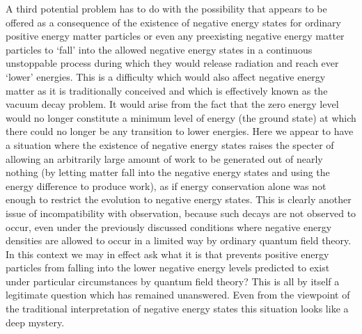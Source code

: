\documentclass[notitlepage,12pt]{report}
\begin{document}
A third potential problem has to do with the possibility that appears to be offered as a consequence of the existence of negative energy states for ordinary positive energy matter particles or even any preexisting negative energy matter particles to `fall' into the allowed negative energy states in a continuous unstoppable process during which they would release radiation and reach ever `lower' energies. This is a difficulty which would also affect negative energy matter as it is traditionally conceived and which is effectively known as the vacuum decay problem. It would arise from the fact that the zero energy level would no longer constitute a minimum level of energy (the ground state) at which there could no longer be any transition to lower energies. Here we appear to have a situation where the existence of negative energy states raises the specter of allowing an arbitrarily large amount of work to be generated out of nearly nothing (by letting matter fall into the negative energy states and using the energy difference to produce work), as if energy conservation alone was not enough to restrict the evolution to negative energy states. This is clearly another issue of incompatibility with observation, because such decays are not observed to occur, even under the previously discussed conditions where negative energy densities are allowed to occur in a limited way by ordinary quantum field theory. In this context we may in effect ask what it is that prevents positive energy particles from falling into the lower negative energy levels predicted to exist under particular circumstances by quantum field theory? This is all by itself a legitimate question which has remained unanswered. Even from the viewpoint of the traditional interpretation of negative energy states this situation looks like a deep mystery.
\end{document}
